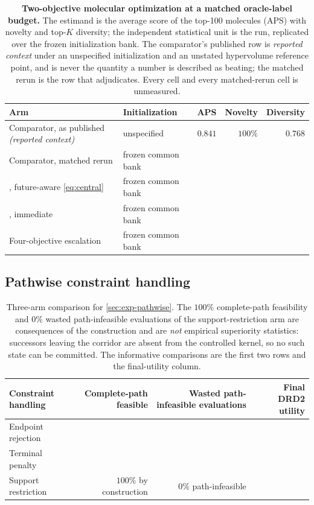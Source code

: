 \begin{table}[h]
\centering
\caption{\small\textbf{Two-objective molecular optimization at a matched oracle-label budget.} The estimand is the average score of the top-100 molecules (APS) with novelty and top-$K$ diversity; the independent statistical unit is the run, replicated over the frozen initialization bank. The comparator's published row is \emph{reported context} under an unspecified initialization and an unstated hypervolume reference point, and is never the quantity a \method{} number is described as beating; the matched rerun is the row that adjudicates. Every \method{} cell and every matched-rerun cell is unmeasured.}
\label{tab:multiobj}
\footnotesize
\begin{tabularx}{\textwidth}{@{}lY r r r@{}}
\toprule
Arm & Initialization & APS & Novelty & Diversity\\
\midrule
Comparator, as published \emph{(reported context)} & unspecified & $0.841$ & $100\%$ & $0.768$\\
Comparator, matched rerun & frozen common bank & \XXX{} & \XXX{} & \XXX{}\\
\method{}, future-aware \eqref{eq:central} & frozen common bank & \XXX{} & \XXX{} & \XXX{}\\
\method{}, immediate & frozen common bank & \XXX{} & \XXX{} & \XXX{}\\
Four-objective escalation & frozen common bank & \XXX{} & \XXX{} & \XXX{}\\
\bottomrule
\end{tabularx}
\end{table}

\subsection{Pathwise constraint handling}
\label{app:pathwise}

\begin{table}[h]
\centering
{\small
\begin{tabular}{lrrr}
\toprule
Constraint handling & Complete-path feasible & Wasted path-infeasible evaluations & Final DRD2 utility \\
\midrule
Endpoint rejection & \XXX{} & \XXX{} & \XXX{} \\
Terminal penalty & \XXX{} & \XXX{} & \XXX{} \\
Support restriction & $100\%$ by construction & $0\%$ path-infeasible & \XXX{} \\
\bottomrule
\end{tabular}}
\caption{\small Three-arm comparison for \cref{sec:exp-pathwise}. The $100\%$ complete-path feasibility and $0\%$ wasted path-infeasible evaluations of the support-restriction arm are consequences of the construction and are \emph{not} empirical superiority statistics: successors leaving the corridor are absent from the controlled kernel, so no such state can be committed. The informative comparisons are the first two rows and the final-utility column.}
\label{tab:pathwise}
\end{table}

